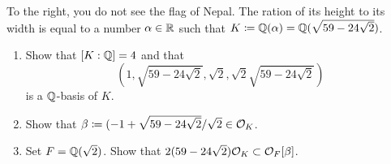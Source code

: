 \documentclass[a4paper,11pt]{article}
\begin{document}
To the right, you do not see the flag of Nepal. The ration of its height to its 
width is equal to a number $\alpha \in \mathbb{R}$ such that $K \coloneqq \mathbb{Q}(\alpha)
= \mathbb{Q}(\sqrt{59-24\sqrt 2})$.
\begin{enumerate}
    \item Show that $[K:\mathbb{Q}]=4$ and that 
        \begin{equation*}
            \left(1, \sqrt{59 - 24\sqrt 2}, \sqrt 2, \sqrt2 \sqrt{59- 24\sqrt 2}
                \right)
        \end{equation*}
        is a $\mathbb{Q}$-basis of $K$.
    \item Show that $\beta \coloneqq (-1 + \sqrt{59 - 24\sqrt 2}/\sqrt 2 \in \mathcal{O}_K$. 
    \item Set $F = \mathbb{Q}(\sqrt 2)$. Show that $2(59- 24\sqrt 2) \mathcal{O}_K \subset
        \mathcal{O}_F[\beta]$. 
\end{enumerate}
\end{document}
